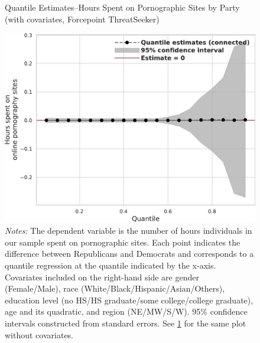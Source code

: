 \documentclass[12pt,twoside]{article}
\begin{document}
\begin{figure}[ht]
	\centering
	\caption{Quantile Estimates--Hours Spent on Pornographic Sites by Party (with covariates, Forcepoint ThreatSeeker)}
	\includegraphics[width=.55\linewidth]{figs/forcepoint_quantile_reg_covariates_duration_adult.pdf}
	\caption*{\footnotesize \emph{Notes:} 
		The dependent variable is the number of hours individuals in our sample spent on pornographic sites.
		Each point indicates the difference between Republicans and Democrats and corresponds to a quantile regression at the quantile indicated by the x-axis.
		Covariates included on the right-hand side are gender (Female/Male), race (White/Black/Hispanic/Asian/Others), education level (no HS/HS graduate/some college/college graduate), age and its quadratic, and region (NE/MW/S/W).
		95\% confidence intervals constructed from standard errors.
		See \cref{fig:forcepoint_quantile_regression_duration_covariates} for the same plot without covariates.
	}
	\label{fig:forcepoint_quantile_regression_duration_covariates}
\end{figure}





\FloatBarrier
\clearpage
\end{document}
